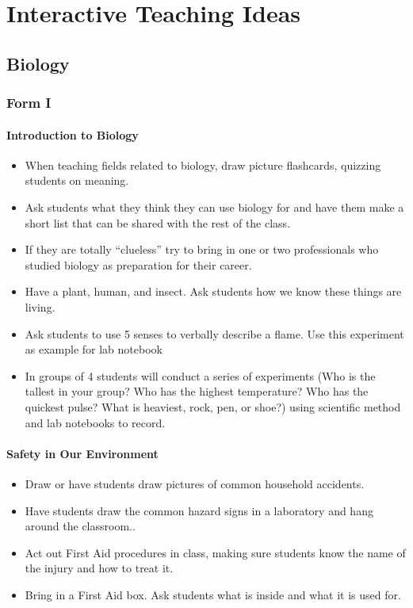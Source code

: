\chapter{Interactive Teaching Ideas}
\section{Biology}
\subsection{Form I}
\subsubsection*{Introduction to Biology}
\begin{itemize}
\item	When teaching fields related to biology, draw picture flashcards, quizzing students on meaning.
\item	Ask students what they think they can use biology for and have them make a short list that can be shared with the rest of the class.
\item	If they are totally ``clueless'' try to bring  in one or two professionals who studied biology as preparation for their career.
\item	Have a plant, human, and insect.  Ask students how we know these things are living.
\item	Ask students to use 5 senses to verbally describe a flame. Use this experiment as example for lab notebook
\item	In groups of 4 students will conduct a series of experiments (Who is the tallest in your group? Who has the highest temperature? Who has the quickest pulse? What is heaviest, rock, pen, or shoe?) using scientific method and lab notebooks to record.
\end{itemize}

\subsubsection{Safety in Our Environment}
\begin{itemize}
\item	Draw or have students draw pictures of common household accidents.
\item	Have students draw the common hazard signs in a laboratory and hang around the classroom..
\item	Act out First Aid procedures in class, making sure students know the name of the injury and how to treat it.
\item	Bring in a First Aid box.  Ask students what is inside and what it is used for.
\end{itemize}

